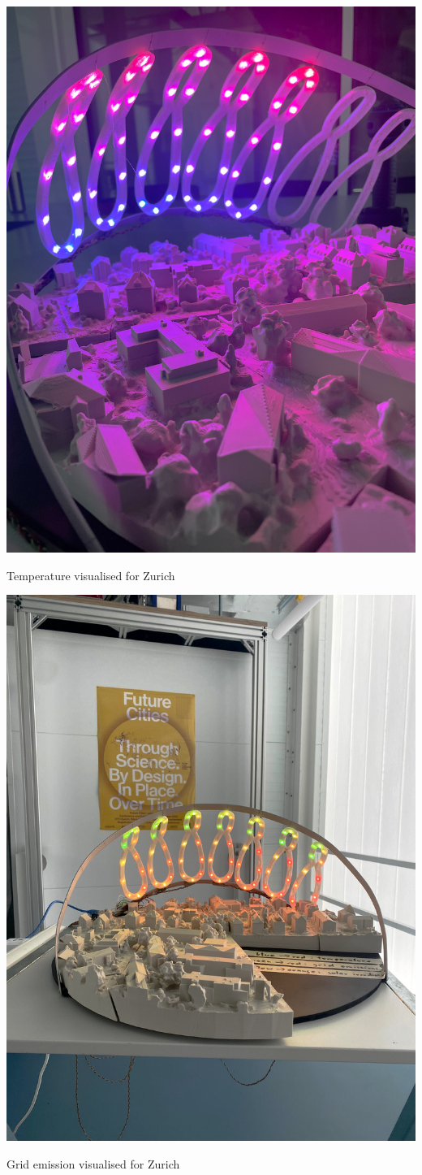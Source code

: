 \documentclass[a4paper,9pt]{article}
\begin{document}
\begin{minipage}{0.48\linewidth}
        \centering
        \includegraphics[width=.59\linewidth]{Images/img_6557.jpg}
  
        \caption{Temperature visualised for Zurich}
        
    \end{minipage}
    \hfill
    \begin{minipage}{0.48\linewidth}
         \centering
        \includegraphics[width=.59\linewidth]{Images/e32895bd-aff2-495c-9af3-a0f7fa5a6cf7.jpg}
     
        \caption{Grid emission visualised for Zurich}
        
    \end{minipage}
\end{document}
